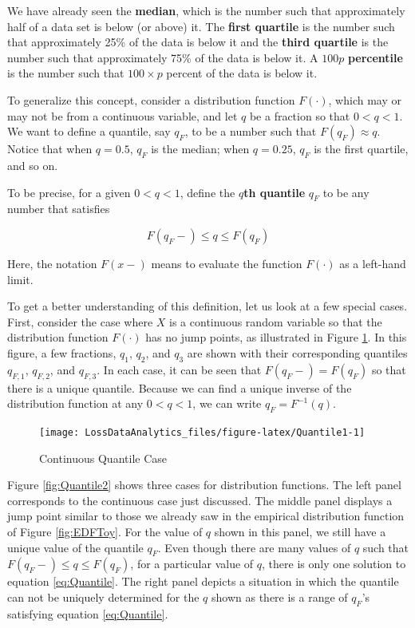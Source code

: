 \documentclass[]{book}
\theoremstyle{definition}
\theoremstyle{definition}
\theoremstyle{definition}
\theoremstyle{remark}
\begin{document}
We have already seen the \textbf{median}, which is the number such that
approximately half of a data set is below (or above) it. The
\textbf{first quartile} is the number such that approximately 25\% of
the data is below it and the \textbf{third quartile} is the number such
that approximately 75\% of the data is below it. A \(100p\)
\textbf{percentile} is the number such that \(100 \times p\) percent of
the data is below it.

To generalize this concept, consider a distribution function
\(F(\cdot)\), which may or may not be from a continuous variable, and
let \(q\) be a fraction so that \(0<q<1\). We want to define a quantile,
say \(q_F\), to be a number such that \(F(q_F) \approx q\). Notice that
when \(q = 0.5\), \(q_F\) is the median; when \(q = 0.25\), \(q_F\) is
the first quartile, and so on.

To be precise, for a given \(0<q<1\), define the \(q\)\textbf{th
quantile} \(q_F\) to be any number that satisfies

\begin{equation} 
  F(q_F-) \le q \le F(q_F)
  \label{eq:Quantile}
\end{equation}

Here, the notation \(F(x-)\) means to evaluate the function \(F(\cdot)\)
as a left-hand limit.

To get a better understanding of this definition, let us look at a few
special cases. First, consider the case where \(X\) is a continuous
random variable so that the distribution function \(F(\cdot)\) has no
jump points, as illustrated in Figure \ref{fig:Quantile1}. In this
figure, a few fractions, \(q_1\), \(q_2\), and \(q_3\) are shown with
their corresponding quantiles \(q_{F,1}\), \(q_{F,2}\), and \(q_{F,3}\).
In each case, it can be seen that \(F(q_F-)= F(q_F)\) so that there is a
unique quantile. Because we can find a unique inverse of the
distribution function at any \(0<q<1\), we can write \(q_F= F^{-1}(q)\).

\begin{figure}

{\centering \texttt{[image: LossDataAnalytics\_files/figure-latex/Quantile1-1]} 

}

\caption{Continuous Quantile Case}\label{fig:Quantile1}
\end{figure}

Figure \ref{fig:Quantile2} shows three cases for distribution functions.
The left panel corresponds to the continuous case just discussed. The
middle panel displays a jump point similar to those we already saw in
the empirical distribution function of Figure \ref{fig:EDFToy}. For the
value of \(q\) shown in this panel, we still have a unique value of the
quantile \(q_F\). Even though there are many values of \(q\) such that
\(F(q_F-) \le q \le F(q_F)\), for a particular value of \(q\), there is
only one solution to equation \eqref{eq:Quantile}. The right panel depicts
a situation in which the quantile can not be uniquely determined for the
\(q\) shown as there is a range of \(q_F\)'s satisfying equation
\eqref{eq:Quantile}.
\end{document}
